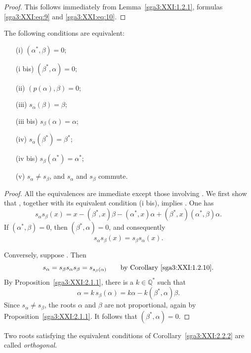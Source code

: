 \begin{proof}
This follows immediately from Lemma~\ref{sga3:XXI:1.2.1},
formulas \eqref{sga3:XXI:eq:9} and \eqref{sga3:XXI:eq:10}.
\end{proof}

\begin{corollary}\label{sga3:XXI:2.2.2}
The following conditions are equivalent:
\begin{enumerate}
\item[\SGAInlineRefTarget{sga3:XXI:2.2.2:item:i}(i)] \((\alpha^\ast,\beta)=0\);
\item[(i bis)] \((\beta^\ast,\alpha)=0\);
\item[(ii)] \((p(\alpha),\beta)=0\);
\item[(iii)] \(s_\alpha(\beta)=\beta\);
\item[(iii bis)] \(s_\beta(\alpha)=\alpha\);
\item[(iv)] \(s_\alpha(\beta^\ast)=\beta^\ast\);
\item[(iv bis)] \(s_\beta(\alpha^\ast)=\alpha^\ast\);
\item[\SGAInlineRefTarget{sga3:XXI:2.2.2:item:v}(v)] \(s_\alpha\neq s_\beta\), and \(s_\alpha\) and \(s_\beta\)
  commute.
\end{enumerate}
\end{corollary}

\begin{proof}
All the equivalences are immediate except those involving . We
first show that , together with its equivalent condition (i bis),
implies . One has
\[
 s_\alpha s_\beta(x)
 =x-(\beta^\ast,x)\beta-(\alpha^\ast,x)\alpha
   +(\beta^\ast,x)(\alpha^\ast,\beta)\alpha.
\]
If \((\alpha^\ast,\beta)=0\), then
\((\beta^\ast,\alpha)=0\), and consequently
\[
 s_\alpha s_\beta(x)=s_\beta s_\alpha(x).
\]

Conversely, suppose . Then
\[
 s_\alpha=s_\beta s_\alpha s_\beta
          =s_{s_\beta(\alpha)}
 \qquad\text{by Corollary~\ref{sga3:XXI:1.2.10}.}
\]
By Proposition~\ref{sga3:XXI:2.1.1}, there is a
\(k\in\mathbb Q^\ast\) such that
\[
 \alpha=k\,s_\beta(\alpha)
       =k\alpha-k(\beta^\ast,\alpha)\beta.
\]
Since \(s_\alpha\neq s_\beta\), the roots \(\alpha\) and \(\beta\)
are not proportional, again by Proposition~\ref{sga3:XXI:2.1.1}.
It follows that \((\beta^\ast,\alpha)=0\).
\end{proof}

\begin{definition}\label{sga3:XXI:2.2.3}
Two roots satisfying the equivalent conditions of
Corollary~\ref{sga3:XXI:2.2.2} are called \emph{orthogonal}.
\end{definition}
